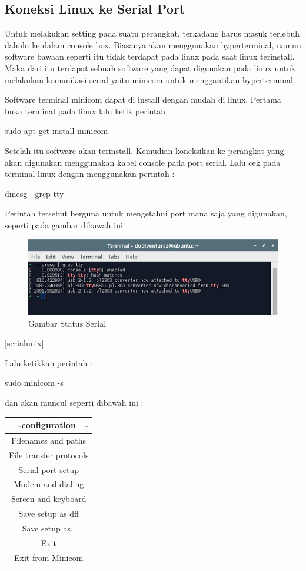 	\subsection{Koneksi Linux ke Serial Port}
	Untuk melakukan setting pada suatu perangkat, terkadang harus masuk terlebuh dahulu ke dalam console box. Biasanya akan menggunakan hyperterminal, namun software bawaan seperti itu tidak terdapat pada linux pada saat linux terinstall. Maka dari itu terdapat sebuah software yang dapat digunakan pada linux untuk melakukan komunikasi serial yaitu minicom untuk menggantikan hyperterminal.
	
	Software terminal minicom dapat di install dengan mudah di linux. Pertama buka terminal pada linux lalu ketik perintah :

	sudo apt-get install minicom

	Setelah itu software akan terinstall. Kemudian koneksikan ke perangkat yang akan digunakan menggunakan kabel console pada port serial. Lalu cek pada terminal linux dengan menggunakan perintah :

	dmesg | grep tty
	
	Perintah tersebut berguna untuk mengetahui port mana saja yang digunakan, seperti pada gambar dibawah ini
	
	\begin{figure} [ht]
	\centerline{\includegraphics[width=1\textwidth]{figures/serialunix.png}}
	\caption{Gambar Status Serial}
	\label{statusserial}
	\end{figure}
	
	\ref{serialunix}
	
	Lalu ketikkan perintah :
	
	sudo minicom -s
	
	dan akan muncul seperti dibawah ini :
	
	\begin{table}[H]
		\begin{tabular}{|c|}
			\hline
			----configuration----\\
			\hline
			Filenames and paths\\
			\hline
			File transfer protocols\\
			\hline
			Serial port setup\\
			\hline
			Modem and dialing\\
			\hline
			Screen and keyboard\\
			\hline
			Save setup as dfl\\
			\hline
			Save setup as..\\
			\hline
			Exit\\
			\hline
			Exit from Minicom\\
		\end{tabular}
	\end{table}
	
